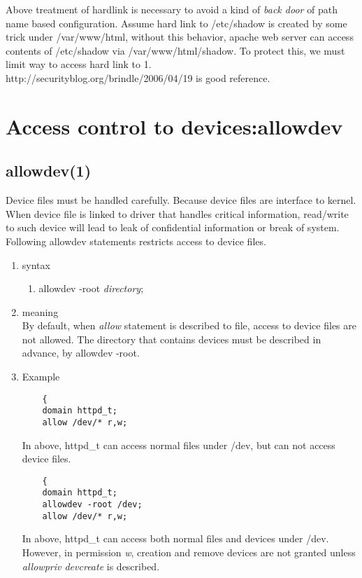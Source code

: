 \documentclass{article}
\begin{document}
       Above treatment of hardlink is necessary to avoid a kind of {\it back door }
       of path name based configuration. Assume hard link to
       /etc/shadow is created by some trick under /var/www/html, without this
       behavior, apache web server can access contents of /etc/shadow
       via /var/www/html/shadow. To protect this, we must limit way to access
       hard link to 1.\\
       http://securityblog.org/brindle/2006/04/19 is good reference.\\



\section{Access control to devices:allowdev}
\subsection{allowdev(1)}
 Device files must be handled carefully. Because device files are
interface to kernel. When device file is linked to driver that handles
critical information, read/write to such device will lead to leak of
confidential information or break of system. Following allowdev
statements restricts access to device files.
\begin{enumerate}
 \item syntax
      \begin{enumerate}
       \item allowdev -root {\it directory};
      \end{enumerate}
 \item meaning\\
	By default, when {\it allow} statement is described to file,
	access to device files are not allowed. The directory that
	contains devices must be described in advance, by allowdev
	-root.

 \item Example\\
       \begin{verbatim}
	{ 
	domain httpd_t;
	allow /dev/* r,w;
       \end{verbatim}
       In above, httpd\_t can access normal files under /dev, but can
       not access device files.
       \begin{verbatim}
	{ 
	domain httpd_t;
	allowdev -root /dev;
	allow /dev/* r,w;
       \end{verbatim}
       In above, httpd\_t can access both normal files and devices under
       /dev.
       However, in permission {\it w}, creation and remove devices are not granted unless {\it allowpriv devcreate } is described. 
\end{enumerate}
\end{document}
